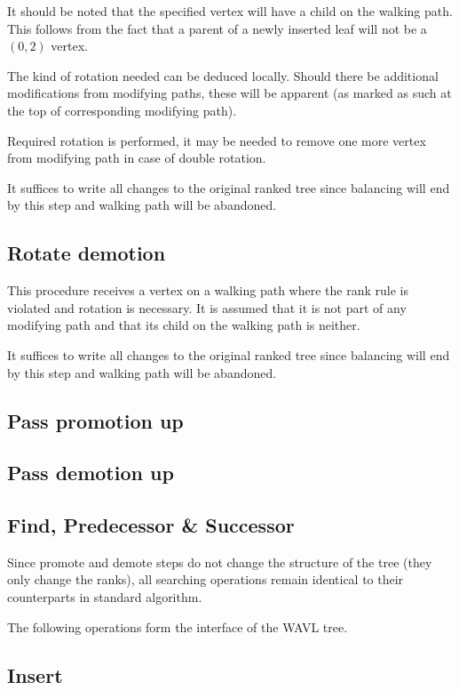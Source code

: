 It should be noted that the specified vertex will have a child on the walking path. This follows from the fact that a parent of a newly inserted leaf will not be a $(0,2)$ vertex.

The kind of rotation needed can be deduced locally. Should there be additional modifications from modifying paths, these will be apparent (as marked as such at the top of corresponding modifying path). 

Required rotation is performed, it may be needed to remove one more vertex from modifying path in case of double rotation.

It suffices to write all changes to the original ranked tree since balancing will end by this step and walking path will be abandoned.

\subsection{Rotate demotion}

This procedure receives a vertex on a walking path where the rank rule is violated and rotation is necessary. It is assumed that it is not part of any modifying path and that its child on the walking path is neither. 

It suffices to write all changes to the original ranked tree since balancing will end by this step and walking path will be abandoned.

\subsection{Pass promotion up}

\subsection{Pass demotion up}

\subsection{Find, Predecessor \& Successor}

Since promote and demote steps do not change the structure of the tree (they only change the ranks), all searching operations remain identical to their counterparts in standard algorithm.


The following operations form the interface of the WAVL tree.

\subsection{Insert}

